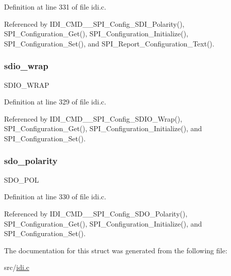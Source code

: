 Definition at line 331 of file idi.\+c.



Referenced by I\+D\+I\+\_\+\+C\+M\+D\+\_\+\+\_\+\+S\+P\+I\+\_\+\+Config\+\_\+\+S\+D\+I\+\_\+\+Polarity(), S\+P\+I\+\_\+\+Configuration\+\_\+\+Get(), S\+P\+I\+\_\+\+Configuration\+\_\+\+Initialize(), S\+P\+I\+\_\+\+Configuration\+\_\+\+Set(), and S\+P\+I\+\_\+\+Report\+\_\+\+Configuration\+\_\+\+Text().

\hypertarget{structspi__cfg_a7cd0897d273b604ea90aaf525ca5d318}{
\subsubsection[{sdio\+\_\+wrap}]{ sdio\+\_\+wrap}}\label{structspi__cfg_a7cd0897d273b604ea90aaf525ca5d318}
S\+D\+I\+O\+\_\+\+W\+R\+A\+P 

Definition at line 329 of file idi.\+c.



Referenced by I\+D\+I\+\_\+\+C\+M\+D\+\_\+\+\_\+\+S\+P\+I\+\_\+\+Config\+\_\+\+S\+D\+I\+O\+\_\+\+Wrap(), S\+P\+I\+\_\+\+Configuration\+\_\+\+Get(), S\+P\+I\+\_\+\+Configuration\+\_\+\+Initialize(), and S\+P\+I\+\_\+\+Configuration\+\_\+\+Set().

\hypertarget{structspi__cfg_abbceffb19dd814b30b890c4c3710a229}{
\subsubsection[{sdo\+\_\+polarity}]{ sdo\+\_\+polarity}}\label{structspi__cfg_abbceffb19dd814b30b890c4c3710a229}
S\+D\+O\+\_\+\+P\+O\+L 

Definition at line 330 of file idi.\+c.



Referenced by I\+D\+I\+\_\+\+C\+M\+D\+\_\+\+\_\+\+S\+P\+I\+\_\+\+Config\+\_\+\+S\+D\+O\+\_\+\+Polarity(), S\+P\+I\+\_\+\+Configuration\+\_\+\+Get(), S\+P\+I\+\_\+\+Configuration\+\_\+\+Initialize(), and S\+P\+I\+\_\+\+Configuration\+\_\+\+Set().



The documentation for this struct was generated from the following file\+:\begin{DoxyCompactItemize}
\item 
src/\hyperlink{idi_8c}{idi.\+c}\end{DoxyCompactItemize}
